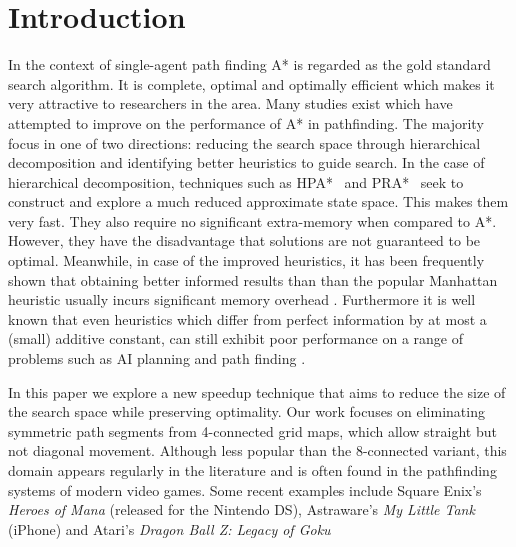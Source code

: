 \section{Introduction}
In the context of single-agent path finding A* \cite{hart68} is regarded as 
the gold standard search algorithm.
It is complete, optimal and optimally efficient which makes it very attractive 
to researchers in the area.
Many studies exist which have attempted to improve on the performance of A* in pathfinding. 
The majority focus in one of two directions: reducing the search space through hierarchical 
decomposition and identifying better heuristics to guide search. 
In the case of hierarchical decomposition, techniques such as
HPA*~\cite{botea04} and PRA*~\cite{sturtevant05} seek to construct and explore
a much reduced approximate state space.
This makes them very fast. 
They also require no significant extra-memory when compared to A*.
However, they have the disadvantage that solutions are not guaranteed to be optimal.
Meanwhile, in case of the improved heuristics, it has been frequently shown
that obtaining better informed results than than the popular
Manhattan heuristic usually incurs significant memory overhead 
\cite{sturtevant09,goldberg05,Cazenave:06,bjornsson06}.
Furthermore it is well known that even heuristics which differ from perfect information 
by at most a (small) additive constant, can still exhibit poor performance on a range of 
problems such as AI planning and path finding \cite{helmert08,pohl77}.
\par
In this paper we explore a new speedup technique that aims to reduce the size of the search 
space while preserving optimality.
Our work focuses on eliminating symmetric path segments from 4-connected grid maps,
which allow straight but not diagonal movement. 
Although less popular than the 8-connected variant, this domain appears regularly in the 
literature  \cite{yap02,wang08,pochter09} and is often found in the pathfinding systems of modern video games.
Some recent examples include Square Enix's \emph{Heroes of Mana} (released for the Nintendo DS),
Astraware's \emph{My Little Tank} (iPhone) and Atari's \emph{Dragon Ball Z: Legacy of Goku} 
